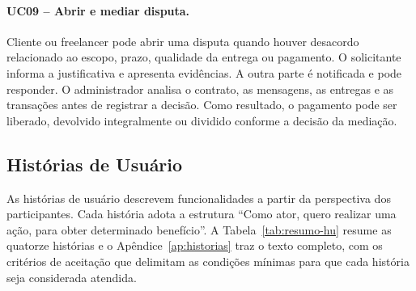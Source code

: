 \documentclass[portuguese]{sbcreviews-2025}
\begin{document}
\paragraph{UC09 -- Abrir e mediar disputa.}

Cliente ou freelancer pode abrir uma disputa quando houver desacordo
relacionado ao escopo, prazo, qualidade da entrega ou pagamento.
O solicitante informa a justificativa e apresenta evidências. A
outra parte é notificada e pode responder. O administrador analisa
o contrato, as mensagens, as entregas e as transações antes de
registrar a decisão. Como resultado, o pagamento pode ser liberado,
devolvido integralmente ou dividido conforme a decisão da mediação.


\subsection{Histórias de Usuário}
\label{subsec:historias-usuario}

As histórias de usuário descrevem funcionalidades a partir da
perspectiva dos participantes. Cada história adota a estrutura
``Como ator, quero realizar uma ação, para obter determinado
benefício''. A Tabela~\ref{tab:resumo-hu} resume as quatorze histórias e o
Apêndice~\ref{ap:historias} traz o texto completo, com os critérios de
aceitação que delimitam as condições mínimas para que cada história
seja considerada atendida.
\end{document}
